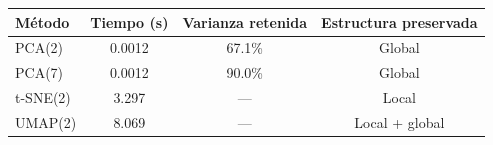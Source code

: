 \begin{tabular}{lccc}
\toprule
Método & Tiempo (s) & Varianza retenida & Estructura preservada \\
\midrule
PCA(2) & 0.0012 & 67.1\% & Global \\
PCA(7) & 0.0012 & 90.0\% & Global \\
t-SNE(2) & 3.297 & --- & Local \\
UMAP(2) & 8.069 & --- & Local + global \\
\bottomrule
\end{tabular}